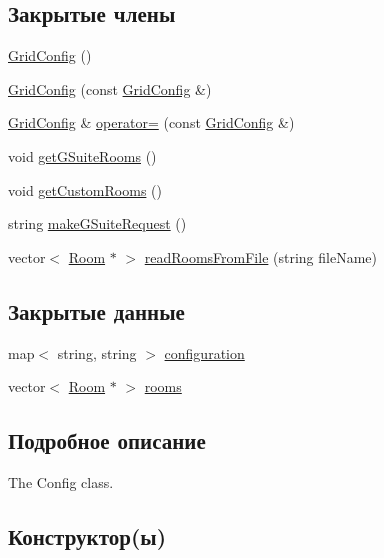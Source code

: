 \subsection*{Закрытые члены}
\begin{DoxyCompactItemize}
\item 
\hyperlink{class_grid_config_ae61afbd4fe461d0c668e33f2480e9061}{Grid\+Config} ()
\item 
\hyperlink{class_grid_config_a5a5beaf46b0f41e6387b6378b9cf4b7c}{Grid\+Config} (const \hyperlink{class_grid_config}{Grid\+Config} \&)
\item 
\hyperlink{class_grid_config}{Grid\+Config} \& \hyperlink{class_grid_config_a852bde866378360d38d0722bb8c98f01}{operator=} (const \hyperlink{class_grid_config}{Grid\+Config} \&)
\item 
void \hyperlink{class_grid_config_af0f79f5721c69162bebeeac5e3bdcf03}{get\+G\+Suite\+Rooms} ()
\item 
void \hyperlink{class_grid_config_a33834786b69a7473552cfb025937c253}{get\+Custom\+Rooms} ()
\item 
string \hyperlink{class_grid_config_aa8cd575c3fe49c27603d6925f690049c}{make\+G\+Suite\+Request} ()
\item 
vector$<$ \hyperlink{class_room}{Room} $\ast$ $>$ \hyperlink{class_grid_config_a7772860b1d46afff422f8208fcd45291}{read\+Rooms\+From\+File} (string file\+Name)
\end{DoxyCompactItemize}
\subsection*{Закрытые данные}
\begin{DoxyCompactItemize}
\item 
map$<$ string, string $>$ \hyperlink{class_grid_config_a9a956728ff118aeb9c1f9b249c50f250}{configuration}
\item 
vector$<$ \hyperlink{class_room}{Room} $\ast$ $>$ \hyperlink{class_grid_config_a1fc61cb11f7c487b1af888f8618a238f}{rooms}
\end{DoxyCompactItemize}


\subsection{Подробное описание}
The Config class. 

\subsection{Конструктор(ы)}
\mbox{\label{class_grid_config_ae61afbd4fe461d0c668e33f2480e9061}} 
